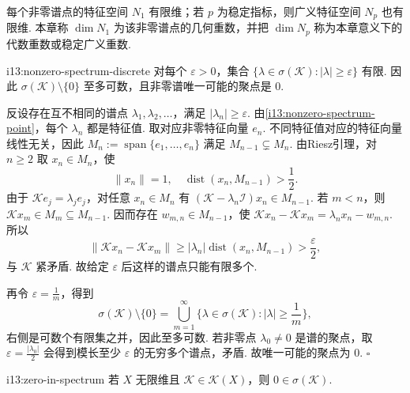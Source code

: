 每个非零谱点的特征空间 \(\displaystyle N_1\) 有限维；若 \(\displaystyle p\) 为稳定指标，则广义特征空间 \(\displaystyle N_p\) 也有限维. 本章称 \(\displaystyle \dim N_1\) 为该非零谱点的几何重数，并把 \(\displaystyle \dim N_p\) 称为本章意义下的代数重数或稳定广义重数.

\begin{FAProposition}[A][非零谱的离散性]{i13:nonzero-spectrum-discrete}
对每个 \(\displaystyle \varepsilon>0\)，集合
\(\displaystyle \{\lambda\in\sigma(\mathcal K):|\lambda|\geqslant\varepsilon\}\)
有限. 因此 \(\displaystyle \sigma(\mathcal K)\setminus\{0\}\) 至多可数，且非零谱唯一可能的聚点是 \(\displaystyle0\).
\end{FAProposition}

\begin{FAProof}
反设存在互不相同的谱点 \(\displaystyle \lambda_1,\lambda_2,\dots\)，满足 \(\displaystyle |\lambda_n|\geqslant\varepsilon\). 由\autoref{i13:nonzero-spectrum-point}，每个 \(\displaystyle \lambda_n\) 都是特征值. 取对应非零特征向量 \(\displaystyle e_n\). 不同特征值对应的特征向量线性无关，因此
\(\displaystyle M_n := \operatorname{span}\{e_1,\dots,e_n\}\)
满足 \(\displaystyle M_{n-1}\subsetneq M_n\). 由Riesz引理，对 \(\displaystyle n\geqslant2\) 取 \(\displaystyle x_n\in M_n\)，使
\[
\|x_n\|=1,
\quad
\operatorname{dist}(x_n,M_{n-1})>\frac{1}{2}.
\]
由于 \(\displaystyle \mathcal K e_j=\lambda_je_j\)，对任意 \(\displaystyle x_n\in M_n\) 有
\(\displaystyle (\mathcal K-\lambda_n\mathcal I)x_n \in M_{n-1}\).
若 \(\displaystyle m<n\)，则 \(\displaystyle \mathcal Kx_m\in M_m\subseteq M_{n-1}\). 因而存在 \(\displaystyle w_{m,n}\in M_{n-1}\)，使
\(\displaystyle \mathcal Kx_n-\mathcal Kx_m = \lambda_nx_n-w_{m,n}\).
所以
\[
\|\mathcal Kx_n-\mathcal Kx_m\|
\geqslant
|\lambda_n|\operatorname{dist}(x_n,M_{n-1})
>
\frac{\varepsilon}{2},
\]
与 \(\displaystyle \mathcal K\) 紧矛盾. 故给定 \(\displaystyle \varepsilon\) 后这样的谱点只能有限多个.

再令 \(\displaystyle \varepsilon=\frac{1}{m}\)，得到
\[
\sigma(\mathcal K)\setminus\{0\}
=
\bigcup_{m=1}^{\infty}
\{\lambda\in\sigma(\mathcal K):|\lambda|\geqslant\frac{1}{m}\},
\]
右侧是可数个有限集之并，因此至多可数. 若非零点 \(\displaystyle \lambda_0\neq0\) 是谱的聚点，取 \(\displaystyle \varepsilon=\frac{|\lambda_0|}{2}\) 会得到模长至少 \(\displaystyle \varepsilon\) 的无穷多个谱点，矛盾. 故唯一可能的聚点为 \(\displaystyle0\).
\hfill\(\square\)
\end{FAProof}

\begin{FAProposition}[B][无限维情形的零谱点]{i13:zero-in-spectrum}
若 \(\displaystyle X\) 无限维且 \(\displaystyle \mathcal K\in\mathcal K(X)\)，则 \(\displaystyle0\in\sigma(\mathcal K)\).
\end{FAProposition}

